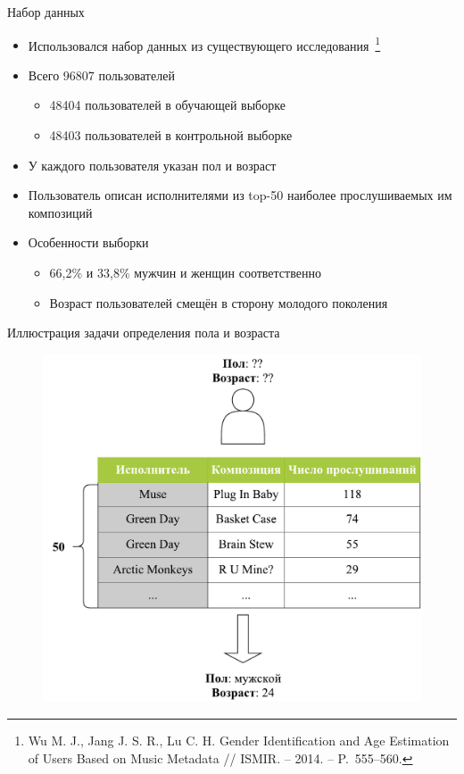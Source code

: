 \documentclass{beamer}
\begin{document}
\begin{frame}{Набор данных}
    \begin{itemize}
        \item {Использовался набор данных из существующего 
              исследования~\footnote{Wu M. J.,
              Jang J. S. R., Lu C. H. Gender Identification
              and Age Estimation of Users Based on Music 
              Metadata // ISMIR. – 2014. – P.~555--560.}}
        \pause
        \item {Всего $96807$ пользователей}
            \begin{itemize}
                \item {48404 пользователей в обучающей выборке}
                \item {48403 пользователей в контрольной выборке}
            \end{itemize}
        \pause
        \item {У каждого пользователя указан пол и возраст}
        \item {Пользователь описан исполнителями из top-50 наиболее
            прослушиваемых им композиций}
        \pause
        \item {Особенности выборки}
            \begin{itemize}
                \item {66{,}2\% и 33{,}8\% мужчин и женщин соответственно}
                \item {Возраст пользователей смещён в сторону молодого поколения}
            \end{itemize}
    \end{itemize}
\end{frame}

\begin{frame}{Иллюстрация задачи определения пола и возраста}
    \begin{figure}
        \includegraphics[scale=0.42]{figures/lastfm-top.pdf}
    \end{figure}
\end{frame}
\end{document}
